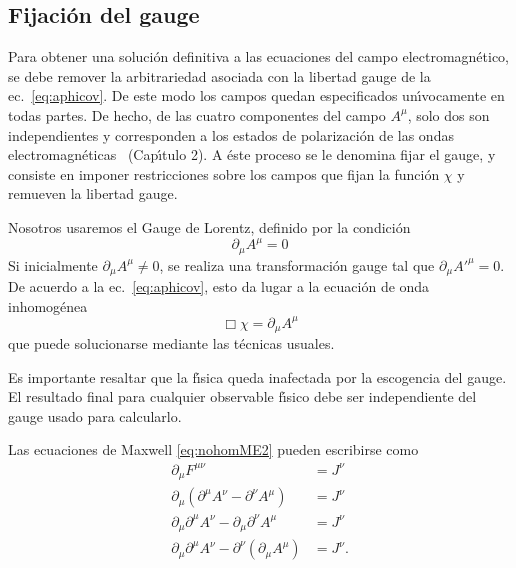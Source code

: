 \subsection{Fijaci\'on del gauge}
\label{sec:fijacion-del-gauge}
\begin{frame}
Para obtener una soluci\'on definitiva a las ecuaciones del campo
electromagn\'etico, se debe remover la arbitrariedad asociada con la
libertad gauge de la ec.~\eqref{eq:aphicov}. De este modo los campos
quedan especificados un\'\i vocamente en todas partes. De hecho, de las
cuatro componentes del campo $A^\mu$, solo dos son independientes y
corresponden a los estados de polarizaci\'on de las ondas
electromagn\'eticas~\cite{Gross} (Cap\'\i tulo 2). A \'este proceso se le
denomina fijar el gauge, y consiste en imponer restricciones sobre los
campos que fijan la funci\'on  $\chi$ y remueven la libertad gauge. 

Nosotros usaremos el Gauge de Lorentz, definido por la condici\'on
\begin{equation}
  \label{eq:20}
  \partial_\mu A^\mu=0
\end{equation}
Si inicialmente $\partial_\mu A^\mu\neq0$, se realiza una transformaci\'on gauge tal
que $\partial_\mu A'^\mu=0$. De acuerdo a la ec.~\eqref{eq:aphicov}, esto da lugar
a la ecuaci\'on de onda inhomog\'enea
\begin{equation*}
\Box\chi=\partial_\mu A^\mu   
\end{equation*}
que puede solucionarse mediante las t\'ecnicas usuales. 

Es importante resaltar que la f\'\i sica queda inafectada por la escogencia
del gauge. El resultado final para cualquier observable f\'\i sico debe
ser independiente del gauge usado para calcularlo.

Las ecuaciones de Maxwell \eqref{eq:nohomME2} pueden escribirse como
\begin{align}
   \partial_\mu F^{\mu\nu}&=J^\nu\nonumber\\
  \partial_\mu(\partial^\mu A^\nu-\partial^\nu A^\mu)&=J^\nu\nonumber\\
  \partial_\mu\partial^\mu A^\nu-\partial_\mu\partial^\nu A^\mu&=J^\nu\nonumber\\
\label{eq:21}
  \partial_\mu\partial^\mu A^\nu-\partial^\nu(\partial_\mu A^\mu)&=J^\nu.
 \end{align}


\end{frame}
